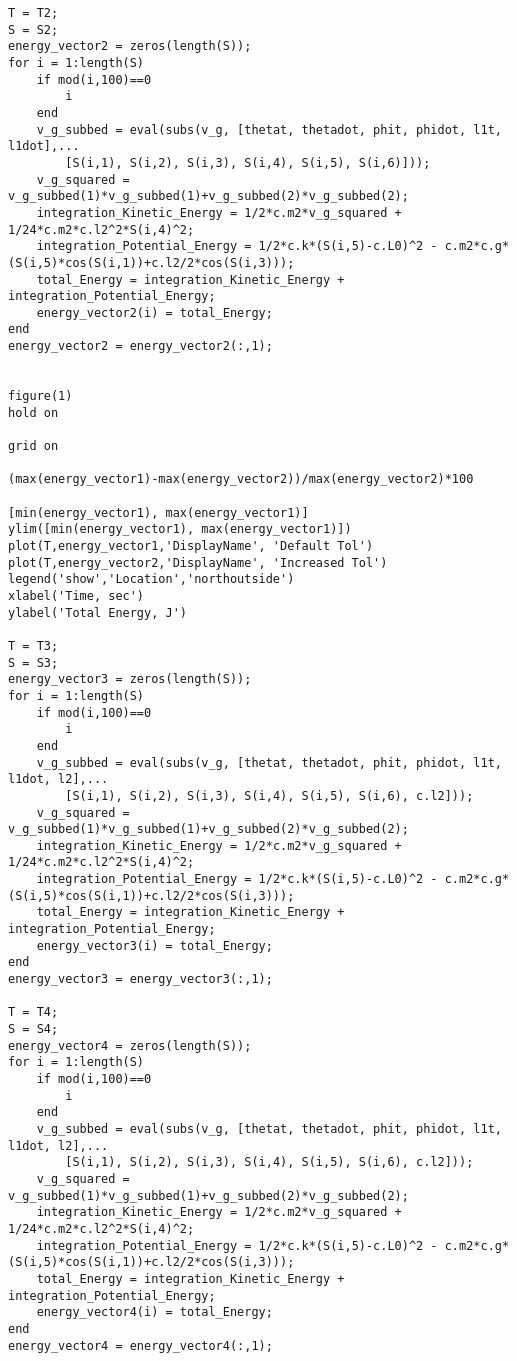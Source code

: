 \begin{lstlisting}[frame=lines,style=Matlab-editor,basicstyle = \mlttfamily]
T = T2;
S = S2;
energy_vector2 = zeros(length(S));
for i = 1:length(S)
    if mod(i,100)==0
        i
    end
    v_g_subbed = eval(subs(v_g, [thetat, thetadot, phit, phidot, l1t, l1dot],...
        [S(i,1), S(i,2), S(i,3), S(i,4), S(i,5), S(i,6)]));
    v_g_squared = v_g_subbed(1)*v_g_subbed(1)+v_g_subbed(2)*v_g_subbed(2);
    integration_Kinetic_Energy = 1/2*c.m2*v_g_squared + 1/24*c.m2*c.l2^2*S(i,4)^2;
    integration_Potential_Energy = 1/2*c.k*(S(i,5)-c.L0)^2 - c.m2*c.g*(S(i,5)*cos(S(i,1))+c.l2/2*cos(S(i,3)));
    total_Energy = integration_Kinetic_Energy + integration_Potential_Energy;
    energy_vector2(i) = total_Energy;
end
energy_vector2 = energy_vector2(:,1);


figure(1)
hold on

grid on

(max(energy_vector1)-max(energy_vector2))/max(energy_vector2)*100

[min(energy_vector1), max(energy_vector1)]
ylim([min(energy_vector1), max(energy_vector1)])
plot(T,energy_vector1,'DisplayName', 'Default Tol')
plot(T,energy_vector2,'DisplayName', 'Increased Tol')
legend('show','Location','northoutside')
xlabel('Time, sec')
ylabel('Total Energy, J')

T = T3;
S = S3;
energy_vector3 = zeros(length(S));
for i = 1:length(S)
    if mod(i,100)==0
        i
    end
    v_g_subbed = eval(subs(v_g, [thetat, thetadot, phit, phidot, l1t, l1dot, l2],...
        [S(i,1), S(i,2), S(i,3), S(i,4), S(i,5), S(i,6), c.l2]));
    v_g_squared = v_g_subbed(1)*v_g_subbed(1)+v_g_subbed(2)*v_g_subbed(2);
    integration_Kinetic_Energy = 1/2*c.m2*v_g_squared + 1/24*c.m2*c.l2^2*S(i,4)^2;
    integration_Potential_Energy = 1/2*c.k*(S(i,5)-c.L0)^2 - c.m2*c.g*(S(i,5)*cos(S(i,1))+c.l2/2*cos(S(i,3)));
    total_Energy = integration_Kinetic_Energy + integration_Potential_Energy;
    energy_vector3(i) = total_Energy;
end
energy_vector3 = energy_vector3(:,1);

T = T4;
S = S4;
energy_vector4 = zeros(length(S));
for i = 1:length(S)
    if mod(i,100)==0
        i
    end
    v_g_subbed = eval(subs(v_g, [thetat, thetadot, phit, phidot, l1t, l1dot, l2],...
        [S(i,1), S(i,2), S(i,3), S(i,4), S(i,5), S(i,6), c.l2]));
    v_g_squared = v_g_subbed(1)*v_g_subbed(1)+v_g_subbed(2)*v_g_subbed(2);
    integration_Kinetic_Energy = 1/2*c.m2*v_g_squared + 1/24*c.m2*c.l2^2*S(i,4)^2;
    integration_Potential_Energy = 1/2*c.k*(S(i,5)-c.L0)^2 - c.m2*c.g*(S(i,5)*cos(S(i,1))+c.l2/2*cos(S(i,3)));
    total_Energy = integration_Kinetic_Energy + integration_Potential_Energy;
    energy_vector4(i) = total_Energy;
end
energy_vector4 = energy_vector4(:,1);



\end{lstlisting}
